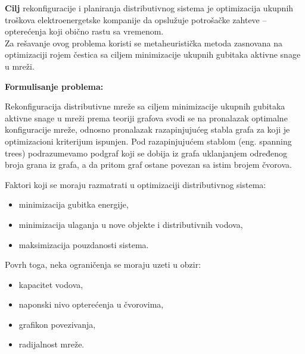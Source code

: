 \documentclass[a4paper]{article}
\begin{document}
\textbf{Cilj} rekonfiguracije i planiranja distributivnog sistema je optimizacija ukupnih troškova elektroenergetske kompanije da opslužuje potrošačke zahteve – opterećenja koji obično rastu sa vremenom.\\

Za rešavanje ovog problema koristi se metaheuristička metoda zasnovana na optimizaciji rojem čestica sa ciljem minimizacije ukupnih gubitaka aktivne snage u mreži. 

\vspace{15mm} 

\begin{flushleft}
\textbf{Formulisanje problema:} 
\end{flushleft}

Rekonfiguracija distributivne mreže sa ciljem minimizacije ukupnih gubitaka aktivne snage u mreži prema teoriji grafova svodi se na pronalazak optimalne konfiguracije mreže, odnosno pronalazak razapinjujućeg stabla grafa za koji je optimizacioni kriterijum ispunjen. Pod razapinjujućem stablom (eng. spanning trees) podrazumevamo podgraf koji se dobija iz grafa uklanjanjem određenog broja  grana iz grafa, a da pritom graf ostane povezan sa istim brojem čvorova. 

\vspace{5mm} 

\begin{flushleft}
Faktori koji se moraju razmatrati  u optimizaciji distributivnog sistema:
\end{flushleft}

\begin{itemize}
    \item minimizacija gubitka energije,
    \item minimizacija ulaganja u nove objekte i distributivnih vodova,
    \item maksimizacija pouzdanosti sistema.
\end{itemize}

\begin{flushleft}
Povrh toga, neka ograničenja se moraju uzeti u obzir:
\end{flushleft}

\begin{itemize}
    \item kapacitet vodova,
    \item naponski nivo opterećenja u čvorovima,
    \item grafikon povezivanja,
    \item radijalnost mreže.
\end{itemize}
\end{document}

